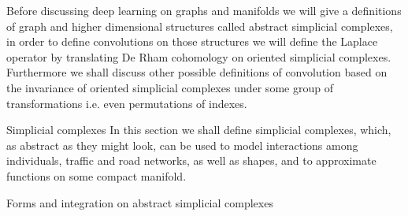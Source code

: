 \documentclass[../main.tex]{subfiles}
\begin{document}
    
    Before discussing deep learning on graphs and manifolds we will give a definitions of
    graph and higher dimensional structures called abstract simplicial complexes, in order 
    to define convolutions on those structures we will define the Laplace operator by 
    translating De Rham cohomology on oriented simplicial complexes.
    Furthermore we shall discuss other possible definitions of convolution based on the invariance of 
    oriented simplicial complexes under some group of transformations i.e. even permutations
    of indexes.     
    
    \begin{section}{Simplicial complexes}
        In this section we shall define simplicial complexes, which, as abstract as they might look, can 
        be used to model interactions among individuals, traffic and road networks, as well as shapes, and 
        to approximate functions on some compact manifold.
            
    \end{section}
    \begin{section}{Forms and integration on abstract simplicial complexes}
            
    \end{section}
\end{document}
